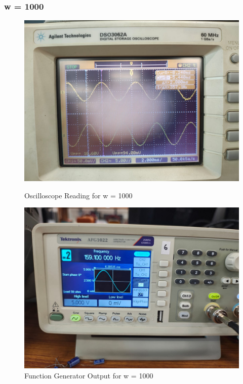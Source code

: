\documentclass[a4paper,12pt]{article}
\begin{document}
\subsubsection{w = 1000}
\begin{figure}[H]
    \centering
    \begin{minipage}{0.48\textwidth}
        \centering
        \includegraphics[width=\textwidth]{fig/2w1000o.jpeg} %
        \caption{Oscilloscope Reading for w = 1000}
    \end{minipage}
    \hfill
    \begin{minipage}{0.48\textwidth}
        \centering
        \includegraphics[width=\textwidth]{fig/2w1000.jpeg} %
        \caption{Function Generator Output for w = 1000}
    \end{minipage}
\end{figure}
\end{document}
